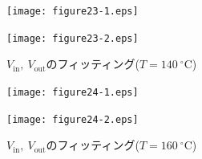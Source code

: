 \documentclass[a4paper,10.5pt]{ltjsarticle}
\begin{document}
\begin{figure}[b]
  \begin{minipage}[h]{0.50\linewidth}
    \centering
    \texttt{[image: figure23-1.eps]}
  \end{minipage}
  \begin{minipage}[h]{0.50\linewidth}
    \centering
    \texttt{[image: figure23-2.eps]}
  \end{minipage}
  \caption{$V_\mathrm{in},\ V_\mathrm{out}$のフィッティング($T=140\ ^\circ \mathrm{C}$)}
\end{figure}
\clearpage
\begin{figure}[htbp]
  \begin{minipage}[h]{0.50\linewidth}
    \centering
    \texttt{[image: figure24-1.eps]}
  \end{minipage}
  \begin{minipage}[h]{0.50\linewidth}
    \centering
    \texttt{[image: figure24-2.eps]}
  \end{minipage}
  \caption{$V_\mathrm{in},\ V_\mathrm{out}$のフィッティング($T=160\ ^\circ \mathrm{C}$)}
\end{figure}
\end{document}
